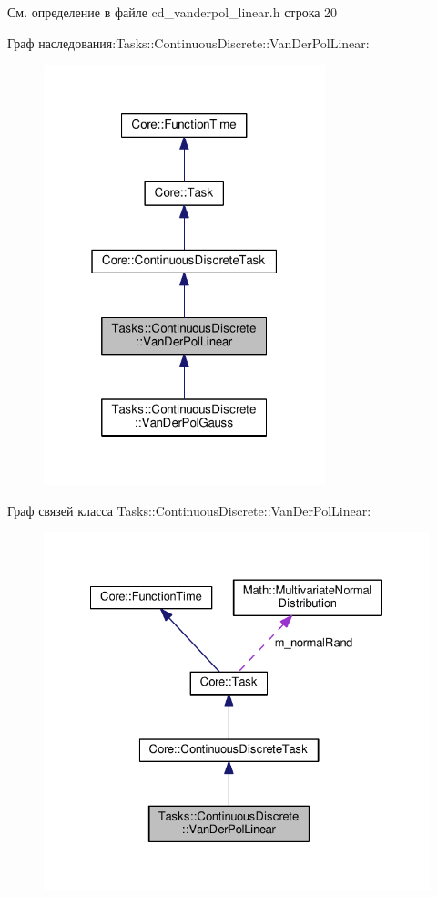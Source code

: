 См. определение в файле cd\+\_\+vanderpol\+\_\+linear.\+h строка 20



Граф наследования\+:Tasks\+:\+:Continuous\+Discrete\+:\+:Van\+Der\+Pol\+Linear\+:
\nopagebreak
\begin{figure}[H]
\begin{center}
\leavevmode
\includegraphics[width=232pt]{class_tasks_1_1_continuous_discrete_1_1_van_der_pol_linear__inherit__graph}
\end{center}
\end{figure}


Граф связей класса Tasks\+:\+:Continuous\+Discrete\+:\+:Van\+Der\+Pol\+Linear\+:
\nopagebreak
\begin{figure}[H]
\begin{center}
\leavevmode
\includegraphics[width=328pt]{class_tasks_1_1_continuous_discrete_1_1_van_der_pol_linear__coll__graph}
\end{center}
\end{figure}


